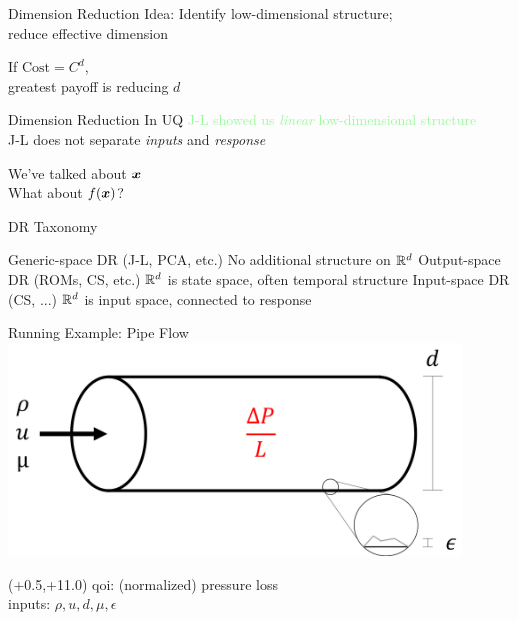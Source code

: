 \documentclass[14pt]{beamer}
\begin{document}

\begin{frame}{Dimension Reduction}
  Idea: Identify low-dimensional structure; \\
  reduce effective dimension

  \bigskip If $\text{Cost} = C^d$, \\
  greatest payoff is reducing $d$
\end{frame}

\begin{frame}{Dimension Reduction \alert{In UQ}}
  \bigskip \textcolor{palegreen}{J-L showed us \emph{linear} low-dimensional structure} \\
  \textcolor{palered}{J-L does not separate \emph{inputs} and \emph{response}}

  \bigskip We've talked about $\boldsymbol{x}$ \\
  What about $f(\boldsymbol{x})$?
\end{frame}

\begin{frame}{DR Taxonomy}
  \begin{outline}
  \1 Generic-space DR (J-L, PCA, etc.)
    \2 No additional structure on $\mathbb{R}^{d}$
  \1 Output-space DR (ROMs, CS, etc.)
    \2 $\mathbb{R}^{d}$ is state space, often temporal structure
  \1 \alert<2>{Input-space DR} (CS, ...)
    \2 $\mathbb{R}^{d}$ is input space, connected to response
  \end{outline}
\end{frame}

\begin{frame}{Running Example: Pipe Flow}
  \centering
  \includegraphics[width=0.9\textwidth]{../images/pipe_diagram}

  \begin{textblock}{6.0}(+0.5,+11.0)
      {\textblockcolor{}
        qoi: (normalized) pressure loss \\
        inputs: $\rho, u, d, \mu, \epsilon$
      }
  \end{textblock}
\end{frame}
\end{document}

